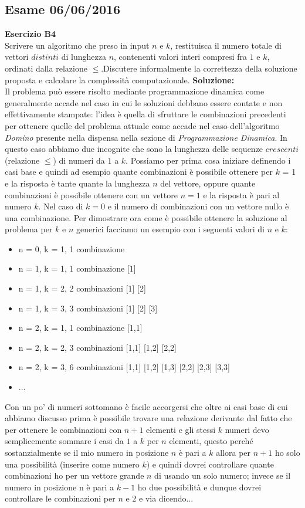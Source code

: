 \documentclass[../cheatSheetAlgoritmi.tex]{subfiles}
\begin{document}
\subsection{Esame 06/06/2016}
\textbf{Esercizio B4}\\
Scrivere un algoritmo che preso in input $n$ e $k$, restituisca il numero totale di vettori $distinti$ di lunghezza $n$, contenenti valori interi compresi fra $1$ e $k$, ordinati dalla relazione $\leq$.Discutere informalmente la correttezza della soluzione proposta e calcolare la complessità computazionale.
\textbf{Soluzione:}\\
Il problema può essere risolto mediante programmazione dinamica come generalmente accade nel caso in cui le soluzioni debbano essere contate e non effettivamente stampate: l'idea è quella di sfruttare le combinazioni precedenti per ottenere quelle del problema attuale come accade nel caso dell'algoritmo \emph{Domino} presente nella dispensa nella sezione di \emph{Programmazione Dinamica}. In questo caso abbiamo due incognite che sono la lunghezza delle sequenze $crescenti$ (relazione $\leq$) di numeri da $1$ a $k$. Possiamo per prima cosa iniziare definendo i casi base e quindi ad esempio quante combinazioni è possibile ottenere per $k$ = 1 e la risposta è tante quante la lunghezza $n$ del vettore, oppure quante combinazioni è possibile ottenere con un vettore $n = 1$ e la risposta è pari al numero $k$. Nel caso di $k = 0$ e il numero di combinazioni con un vettore nullo è una combinazione. Per dimostrare ora come è possibile ottenere la soluzione al problema per $k$ e $n$ generici facciamo un esempio con i seguenti valori di $n$ e $k$:
\begin{itemize}
	\item n = 0, k = 1, 1 combinazione
	\item n = 1, k = 1, 1 combinazione 		[1]
	\item n = 1, k = 2, 2 combinazioni 		[1] [2]
	\item n = 1, k = 3, 3 combinazioni		[1] [2] [3]
	\item n = 2, k = 1, 1 combinazione		[1,1]
	\item n = 2, k = 2, 3 combinazioni		[1,1] [1,2] [2,2]
	\item n = 2, k = 3, 6 combinazioni		[1,1] [1,2] [1,3] [2,2] [2,3] [3,3]
	\item ...
\end{itemize}
Con un po' di numeri sottomano è facile accorgersi che oltre ai casi base di cui abbiamo discusso prima è possibile trovare una relazione derivante dal fatto che per ottenere le combinazioni con $n+1$ elementi e gli stessi $k$ numeri devo semplicemente sommare i casi da $1$ a $k$ per $n$ elementi, questo perché sostanzialmente se il mio numero in posizione $n$ è pari a $k$ allora per $n+1$ ho solo una possibilità (inserire come numero $k$) e quindi dovrei controllare quante combinazioni ho per un vettore grande $n$ di usando un solo numero; invece se il numero in posizione n è pari a $k-1$ ho due possibilità e dunque dovrei controllare le combinazioni per $n$ e $2$ e via dicendo...\\
\end{document}
